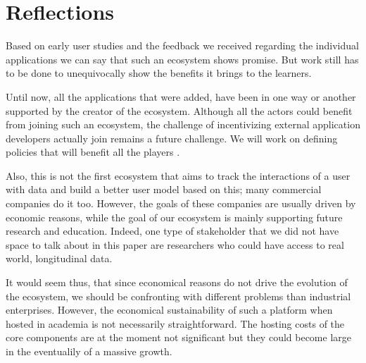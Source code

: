 
\section {Reflections}

Based on early user studies and the feedback we received 
regarding the individual applications we can say that such
an ecosystem shows promise. But work still has to 
be done to unequivocally show the benefits it brings 
to the learners. 

Until now, all the applications that were added, have been in one way or another supported by the creator of the ecosystem. Although all the actors could benefit from joining such an ecosystem,  the challenge of incentivizing external application developers actually join remains a future challenge. We will work on defining policies that will benefit all the players \cite{Jans09agenda}. 


Also, this is not the first ecosystem that aims to track 
the interactions of a user with data and build a better 
user model based on this; many commercial companies do it too. 
However, the goals of these companies are usually driven by economic reasons, 
while the goal of our ecosystem is mainly supporting future research and education. Indeed, one type of stakeholder that we did not have space to talk about in this paper are researchers who could have access to real world, longitudinal data.

It would seem thus, that since economical reasons do not drive the evolution of the ecosystem, we should be confronting with different problems than industrial enterprises. However, the economical 
sustainability of such a platform when hosted in academia
is not necessarily straightforward. The hosting costs of the 
core components are at the moment not significant 
but they could become large in the eventualily of 
a massive growth. 








